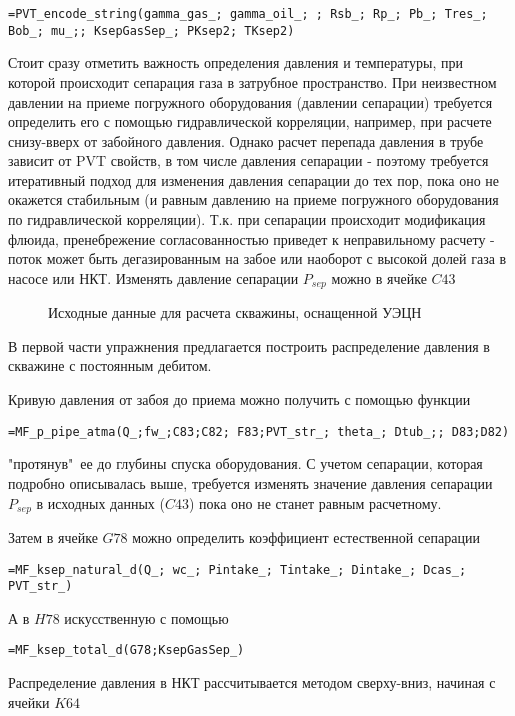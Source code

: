 { \small  \texttt{=PVT\_encode\_string(gamma\_gas\_; gamma\_oil\_; ; Rsb\_; Rp\_; Pb\_; Tres\_; Bob\_; mu\_;; KsepGasSep\_; PKsep2; TKsep2)
}}

Стоит сразу отметить важность определения давления и температуры, при которой происходит сепарация газа в затрубное пространство. При неизвестном давлении на приеме погружного оборудования (давлении сепарации) требуется определить его с помощью гидравлической корреляции, например, при расчете снизу-вверх от забойного давления. Однако расчет перепада давления в трубе зависит от PVT свойств, в том числе давления сепарации - поэтому требуется итеративный подход для изменения давления сепарации до тех пор, пока оно не окажется стабильным (и равным давлению на приеме погружного оборудования по гидравлической корреляции). Т.к. при сепарации происходит модификация флюида, пренебрежение согласованностью приведет к неправильному расчету - поток может быть дегазированным на забое или наоборот с высокой долей газа в насосе или НКТ. Изменять давление сепарации $P_{sep}$ можно в ячейке $C43$

\begin{figure}[h!]
	\center{\texttt{[image: Ex100\_1]}}
	\caption{Исходные данные для расчета скважины, оснащенной УЭЦН}
	\label{ris:Ex100_1}
\end{figure}

В первой части упражнения предлагается построить распределение давления в скважине с постоянным дебитом. 

Кривую давления от забоя до приема можно получить с помощью функции

{ \small  \texttt{=MF\_p\_pipe\_atma(Q\_;fw\_;C83;C82; F83;PVT\_str\_; theta\_; Dtub\_;; D83;D82)
}}

"протянув"\ ее до глубины спуска оборудования. С учетом сепарации, которая подробно описывалась выше, требуется изменять значение давления сепарации $P_{sep}$ в исходных данных ($C43$) пока оно не станет равным расчетному.

Затем в ячейке $G78$ можно определить коэффициент естественной сепарации

{ \small  \texttt{=MF\_ksep\_natural\_d(Q\_; wc\_; Pintake\_; Tintake\_; Dintake\_; Dcas\_; PVT\_str\_)
}}

А в $H78$ искусственную с помощью 

{ \small  \texttt{=MF\_ksep\_total\_d(G78;KsepGasSep\_)
}}

Распределение давления в НКТ рассчитывается методом сверху-вниз, начиная с ячейки $K64$


